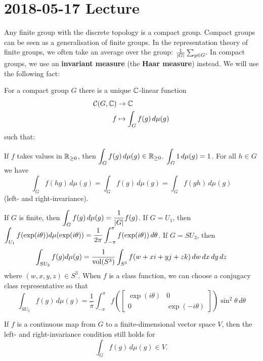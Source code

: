\section{2018-05-17 Lecture}

Any finite group with the discrete topology is a compact group.
Compact groups can be seen as a generalisation of finite groups.
In the representation theory of finite groups, we often take an average over the group: $\frac{1}{\left\lvert G \right\rvert}\sum_{g \in G}$.
In compact groups, we use an \textbf{invariant measure} (the \textbf{Haar measure}) instead.
We will use the following fact:

\begin{thm}
  For a compact group $G$ there is a unique $\mathbb{C}$-linear function
  \begin{align*}
    \mathcal{C}(G,\mathbb{C}) &\to \mathbb{C} \\
    f &\mapsto \int_G f(g) \, d\mu(g)
  \end{align*}
  such that:
  \begin{enum}
    \io If $f$ takes values in $\mathbb{R}_{\geq 0}$, then $\displaystyle \int_G f(g) \, d\mu(g) \in \mathbb{R}_{\geq 0}$.
    \io $\displaystyle \int_G 1 \, d\mu(g) = 1$.
    \io For all $h \in G$ we have
    \[ \int_G f(hg) \, d\mu(g) = \int_G f(g) \, d\mu(g) = \int_G f(gh) \, d\mu(g) \]
    (left- and right-invariance).
  \end{enum}
\end{thm}

\begin{exam}
  \lv
  \begin{enum}
    \io If $G$ is finite, then $\displaystyle \int_G f(g) \, d\mu(g) = \frac{1}{\left\lvert G \right\rvert} f(g)$.
    \io If $G=U_1$, then $\displaystyle \int_{U_1} f(\exp(i\theta)) d\mu(\exp(i\theta)) = \frac{1}{2\pi} \int_{-\pi}^\pi f(\exp(i\theta)) \, d\theta$.
    \io If $G=SU_3$, then
    \[ \int_{SU_2} f(g) d\mu(g) = \frac{1}{\operatorname{vol}(S^3)} \int_{S^3} f(w+xi+yj+zk) \, dw \, dx \, dy \, dz \]
    where $(w,x,y,z) \in S^3$.
    When $f$ is a class function, we can choose a conjugacy class representative so that
    \[ \int_{SU_2} f(g) \, d\mu(g) = \frac 1\pi \int_{-\pi}^\pi f \left( 
	\begin{bmatrix}
	  \exp(i\theta) & 0 \\ 0 & \exp(-i\theta)
	\end{bmatrix}
    \right) \sin^2\theta \, d\theta \]
  \end{enum}
\end{exam}

\begin{rmk}
  If $f$ is a continuous map from $G$ to a finite-dimensional vector space $V$, then the left- and right-invariance condition still holds for
  \[ \int_G f(g) \, d\mu(g) \in V. \]
\end{rmk}

